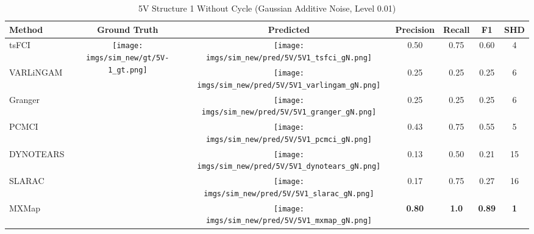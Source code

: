\begin{table}[htb]
\begin{tabular}{l|c|c|c|c|c|c}
Method    & Ground Truth      & Predicted & Precision     & Recall       & F1            & SHD        \\ \hline
tsFCI     & \multirow{7}{*}[-9.6em]{\begin{minipage}{.17\linewidth} \centering \texttt{[image: imgs/sim\_new/gt/5V-1\_gt.png]} \end{minipage}} &  \begin{minipage}{.17\linewidth} \centering \texttt{[image: imgs/sim\_new/pred/5V/5V1\_tsfci\_gN.png]} \end{minipage} & 0.50          & 0.75         & 0.60          & 4          \\
VARLiNGAM &                   & \begin{minipage}{.17\linewidth} \centering \texttt{[image: imgs/sim\_new/pred/5V/5V1\_varlingam\_gN.png]} \end{minipage} & 0.25          & 0.25         & 0.25          & 6          \\
Granger   &                   & \begin{minipage}{.17\linewidth} \centering \texttt{[image: imgs/sim\_new/pred/5V/5V1\_granger\_gN.png]} \end{minipage}  & 0.25          & 0.25         & 0.25          & 6          \\
PCMCI     &                   & \begin{minipage}{.17\linewidth} \centering \texttt{[image: imgs/sim\_new/pred/5V/5V1\_pcmci\_gN.png]} \end{minipage} & 0.43          & 0.75         & 0.55          & 5          \\
DYNOTEARS &                   & \begin{minipage}{.17\linewidth} \centering \texttt{[image: imgs/sim\_new/pred/5V/5V1\_dynotears\_gN.png]} \end{minipage} & 0.13          & 0.50         & 0.21          & 15         \\
SLARAC    &                   &  \begin{minipage}{.17\linewidth} \centering \texttt{[image: imgs/sim\_new/pred/5V/5V1\_slarac\_gN.png]} \end{minipage} & 0.17          & 0.75         & 0.27          & 16         \\ \cline{1-1} \cline{3-7} 
MXMap     &                   & \begin{minipage}{.17\linewidth} \centering \texttt{[image: imgs/sim\_new/pred/5V/5V1\_mxmap\_gN.png]} \end{minipage}  & \textbf{0.80} & \textbf{1.0} & \textbf{0.89} & \textbf{1}
\end{tabular}
\caption{5V Structure 1 Without Cycle (Gaussian Additive Noise, Level 0.01)}
\label{tab:5V1_gN}
\end{table}


